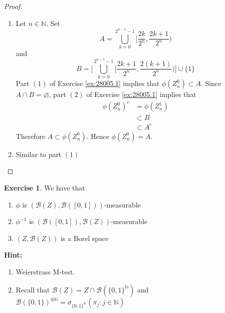 \documentclass{book}
\theoremstyle{definition}
\newtheorem{ex}[definition]{Exercise}
\newcommand{\sig}{\sigma}
\newcommand{\N}{\mathbb{N}}
\newcommand{\MB}{\mathcal{B}}
\newcommand{\lex}[1]{\label{ex:#1}}
\newcommand{\rex}[1]{Exercise \ref{ex:#1}}
\DeclareMathOperator*{\0}{\mbf{0}}
\DeclareMathOperator*{\1}{\mbf{1}}
\begin{document}
	\begin{proof}\
		\begin{enumerate}
			\item Let $n \in \N$. Set 
			$$A =  \bigcup\limits_{k =0}^{2^{n-1} - 1} \bigg[ \frac{2k}{2^n}, \frac{2k+1}{2^n} \bigg)$$ 
			and 
			$$B = \bigg[ \bigcup\limits_{k =0}^{2^{n-1} -1} \bigg[ \frac{2k + 1}{2^n}, \frac{2(k+1)}{2^n} \bigg) \bigg] \cup \{1\}$$ 
			Part $(1)$ of \rex{28005.1} implies that $\phi(Z_n^0) \subset A$. Since $A \cap B = \varnothing$, part $(2)$ of \rex{28005.1} implies that 
			\begin{align*}
				\phi(Z_n^0)^c 
				& = \phi(Z_n^1) \\
				& \subset B \\
				& \subset A^c
			\end{align*} 
			Therefore $A \subset \phi(Z_n^0)$. Hence $\phi(Z_n^0) = A$.
			\item Similar to part $(1)$
		\end{enumerate}
	\end{proof}

	\begin{ex} \lex{28006} 
		We have that
		\begin{enumerate}
			\item $\phi$ is $(\MB(Z), \MB([0,1]))$-measurable
			\item $\phi^{-1}$ is $(\MB([0,1]), \MB(Z))$-measurable
			\item $(Z, \MB(Z))$ is a Borel space
		\end{enumerate}
		\textbf{Hint: } \begin{enumerate}
			\item Weierstrass M-test.
			\item Recall that $\MB(Z) = Z \cap \MB(\{0,1\}^{\N})$ and $\MB(\{0,1\})^{\otimes \N} = \sig_{\{0,1\}^{\N}} (\pi_j: j \in \N)$
		\end{enumerate} 
	\end{ex}
\end{document}
